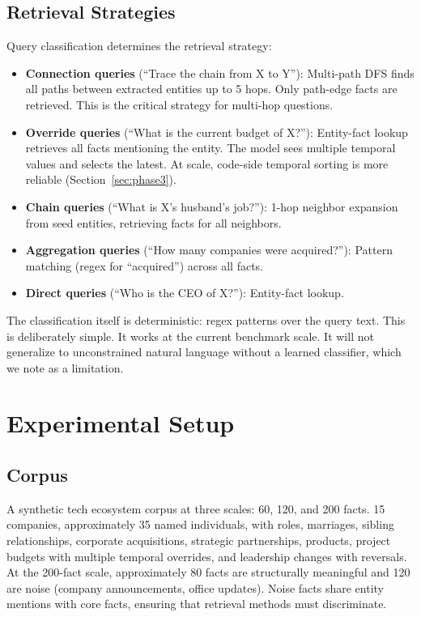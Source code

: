 \documentclass[11pt,a4paper]{article}
\begin{document}
\subsection{Retrieval Strategies}

Query classification determines the retrieval strategy:

\begin{itemize}[leftmargin=*]
    \item \textbf{Connection queries} (``Trace the chain from X to Y''): Multi-path DFS finds all paths between extracted entities up to 5 hops. Only path-edge facts are retrieved. This is the critical strategy for multi-hop questions.

    \item \textbf{Override queries} (``What is the current budget of X?''): Entity-fact lookup retrieves all facts mentioning the entity. The model sees multiple temporal values and selects the latest. At scale, code-side temporal sorting is more reliable (Section~\ref{sec:phase3}).

    \item \textbf{Chain queries} (``What is X's husband's job?''): 1-hop neighbor expansion from seed entities, retrieving facts for all neighbors.

    \item \textbf{Aggregation queries} (``How many companies were acquired?''): Pattern matching (regex for ``acquired'') across all facts.

    \item \textbf{Direct queries} (``Who is the CEO of X?''): Entity-fact lookup.
\end{itemize}

The classification itself is deterministic: regex patterns over the query text. This is deliberately simple. It works at the current benchmark scale. It will not generalize to unconstrained natural language without a learned classifier, which we note as a limitation.

\section{Experimental Setup}
\label{sec:setup}

\subsection{Corpus}

A synthetic tech ecosystem corpus at three scales: 60, 120, and 200 facts. 15 companies, approximately 35 named individuals, with roles, marriages, sibling relationships, corporate acquisitions, strategic partnerships, products, project budgets with multiple temporal overrides, and leadership changes with reversals. At the 200-fact scale, approximately 80 facts are structurally meaningful and 120 are noise (company announcements, office updates). Noise facts share entity mentions with core facts, ensuring that retrieval methods must discriminate.
\end{document}
